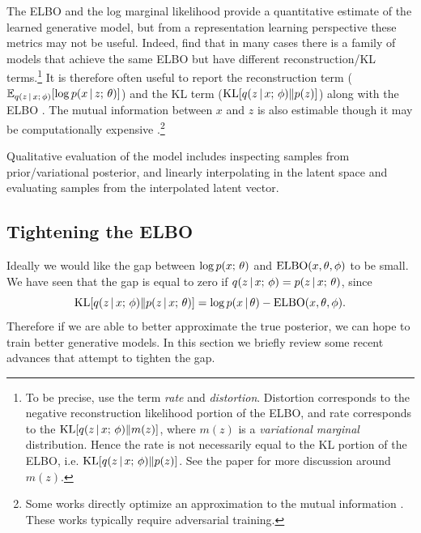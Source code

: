 \documentclass{article}
\begin{document}
The ELBO and the log marginal likelihood provide a quantitative estimate of the learned generative model, 
but from a representation learning perspective these metrics may not be useful.
Indeed, \citet{alemi2018} find that in many cases there is a family of models that achieve
the same ELBO but have different reconstruction/KL terms.\footnote{To be precise,
\cite{alemi2018} use the term \emph{rate} and \emph{distortion}. Distortion corresponds to the negative
reconstruction likelihood portion of the ELBO, and rate corresponds to the $\operatorname*{KL} [q(z \,|\, x ; \, \phi) \Vert m(z)]$,
where $m(z)$ is a \emph{variational marginal} distribution. Hence the rate is not necessarily
equal to the KL portion of the ELBO, i.e. $\operatorname*{KL} [q(z \,|\, x ; \, \phi) \Vert p(z)]$. See the paper
for more discussion around $m(z)$.} It is therefore often useful to report the reconstruction 
term ($\mathbb{E}_{q(z \,|\, x ; \, \phi)}[\log p( x \,|\, z ; \, \theta)]$) and the KL term ($\operatorname*{KL} [q(z \,|\, x ; \, \phi) \Vert p(z)]$) along with the ELBO \citep{Bowman2016,Gulrajani2017,Yang2017}. The mutual information between $x$ and $z$ is also estimable though it may be computationally expensive \citep{hoffman2016elbo}.\footnote{Some works directly optimize an approximation to the mutual information
\citep{zhao2018infovae,belghazi2018,gao2018tc}. These works typically require adversarial training.}

Qualitative evaluation of the model includes inspecting samples from prior/variational posterior,
and linearly interpolating in the latent space and evaluating samples from the interpolated latent vector.

\subsection{Tightening the ELBO}\label{tightening}
Ideally we would like the gap between $\log p(x ; \, \theta) $ and $\operatorname*{ELBO}(x, \theta, \phi)$
to be small. We have seen that the gap is equal to zero if $q(z \,|\, x ; \, \phi) = p(z \,|\, x ; \, \theta)$, since
\[ \operatorname*{KL}[q(z \,|\, x ; \, \phi) \Vert p(z \,|\, x ; \, \theta)] = \log p(x \,|\, \theta) - \operatorname*{ELBO}(x, \theta, \phi). \]
Therefore if we are able to better approximate the true posterior, we can hope to train better
generative models. In this section we briefly review some recent advances that attempt to
tighten the gap.
\end{document}
